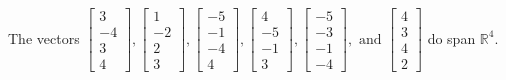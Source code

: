 \begin{exercise}
\begin{exerciseStatement}
  \end{exerciseStatement}
  \begin{exerciseAnswer}
   The vectors \(\left[\begin{array}{r}
3 \\
-4 \\
3 \\
4
\end{array}\right] , \left[\begin{array}{r}
1 \\
-2 \\
2 \\
3
\end{array}\right] , \left[\begin{array}{r}
-5 \\
-1 \\
-4 \\
4
\end{array}\right] , \left[\begin{array}{r}
4 \\
-5 \\
-1 \\
3
\end{array}\right] , \left[\begin{array}{r}
-5 \\
-3 \\
-1 \\
-4
\end{array}\right] , \text{ and } \left[\begin{array}{r}
4 \\
3 \\
4 \\
2
\end{array}\right]\) 
  	 do  
	span \(\mathbb{R}^4\).
  


  \end{exerciseAnswer}
\end{exercise}